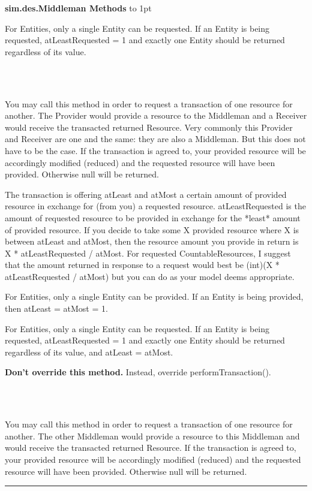 \documentclass[twoside,10pt]{article}
\newcommand\class[1]{\index{Classes!{#1}}\textsf{#1}}
\newcommand\code[1]{\textsf{#1}}
\newcommand*{\xfill}[1][0pt]{%
	\cleaders
		\hbox to 1pt{\hss
			\raisebox{#1}{\rule{1.2pt}{0.4pt}}%
			\hss}\hfill}
\newenvironment{methods}[1]{
\vspace{1.0em}\noindent\textsf{\textbf{#1 Methods}}\quad \xfill[0.5ex]
\vspace{-0.25em}
\begin{description}
\small}
{\end{description}\hrule\vspace{1.5em}}
\newcommand{\mthd}[1]{\item[{\sf #1}]~\newline}
\begin{document}
\begin{methods}{\class{sim.des.Middleman}}
For Entities, only a single Entity can be requested.  If an Entity is being requested, atLeastRequested = 1
    	and exactly one Entity should be returned regardless of its value. 
	
\mthd{public Resource transact(Provider provider, Receiver receiver, Resource provided, double atLeast, double atMost,}
\rule{0pt}{0pt}\hspace{\fill}{\sf Resource requestedType, double atLeastRequested)}\\
You may call this method in order to request a transaction of one resource for another.    	
    	The Provider would provide a resource to the Middleman and a Receiver would receive the transacted returned Resource.
    	Very commonly this Provider and Receiver are one and the same: they are also a Middleman.  But this does not have to be the case.  	
		If the transaction is agreed to, your provided resource will be accordingly modified (reduced) and the requested
		resource will have been provided.  Otherwise null will be returned.
		
The transaction is offering atLeast and atMost a certain amount of provided resource in exchange for
    	(from you) a requested resource.  atLeastRequested is the amount of requested resource to be provided
    	in exchange for the *least* amount of provided resource.  If you decide to take some X provided resource
    	where X is between atLeast and atMost, then the resource amount you provide in return is \code{X * atLeastRequested / atMost}.
    	For requested CountableResources, I suggest that the amount returned in response to a request would best be
    	\code{(int)(X * atLeastRequested / atMost)} but you can do as your model deems appropriate.
    	
For Entities, only a single Entity can be provided.  If an Entity is being provided, then atLeast = atMost = 1.
    	
For Entities, only a single Entity can be requested.  If an Entity is being requested, atLeastRequested = 1
    	and exactly one Entity should be returned regardless of its value, and atLeast = atMost. 
    	
{\bf Don't override this method.}  Instead, override performTransaction().
	
\mthd{public Resource transact(Middleman middleman, Resource provided, double atLeast, double atMost,}
\rule{0pt}{0pt}\hspace{\fill}{\sf Resource requestedType, double atLeastRequested)}\\
You may call this method in order to request a transaction of one resource for another.    	
    	The other Middleman would provide a resource to this Middleman and would receive the transacted returned Resource.
		If the transaction is agreed to, your provided resource will be accordingly modified (reduced) and the requested
		resource will have been provided.  Otherwise null will be returned.
		

\end{methods}
\end{document}

